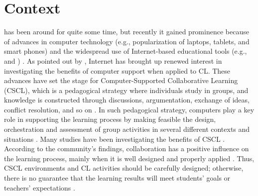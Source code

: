 \section{Context}

 has been around for quite some time, but recently it gained prominence because of advances in computer technology (e.g., popularization of laptops, tablets, and smart phones) and the widespread use of Internet-based educational tools (e.g.,  and ) \cite{From_mirroring_to_guiding}.
As pointed out by , Internet has brought up renewed interest in investigating the benefits of computer support when applied to CL.
These advances have set the stage for Computer-Supported Collaborative Learning (CSCL), which is a pedagogical strategy where individuals study in groups, and knowledge is constructed through discussions, argumentation, exchange of ideas, conflict resolution, and so on \cite{CSCL_historical_perspective}. 
In such pedagogical strategy, computers play a key role in supporting the learning process by making feasible the design, orchestration and assessment of group activities in several different contexts and situations \cite{CSCL_and_Innovation}.
Many studies have been investigating the benefits of CSCL \cite{CSCL_historical_perspective,Collaborative_Learning_Techniques,Theory-Driven_Group_Formation,Designing_for_interaction}. 
According to the community's findings, collaboration has a positive influence on the learning process, mainly when it is well designed and properly applied \cite{The_pedagogical_challenges_to_collaborative_technologies}. 
Thus, CSCL environments and CL activities should be carefully designed; otherwise, there is no guarantee that the learning results will meet students’ goals or teachers’ expectations \cite{Why_some_groups_fail,Collaborative_Learning_Techniques}. 

